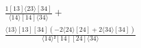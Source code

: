\documentclass[varwidth, border=5pt]{standalone}
\begin{document}
\begin{my}
$\begin{gathered}
\scriptscriptstyle\frac{1[13]⟨23⟩[34]}{⟨14⟩[14]⟨34⟩} +\\
\scriptscriptstyle\frac{⟨13⟩[13][34](-2⟨24⟩[24]+2⟨34⟩[34])}{⟨14⟩²[14][24]⟨34⟩} \phantom{+}
\end{gathered}$
\end{my}
\end{document}
